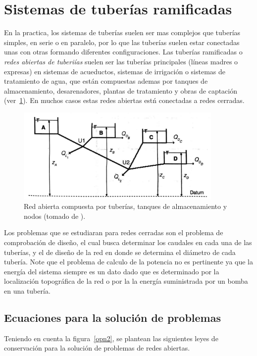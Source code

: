 \documentclass[11pt, oneside]{article}
\begin{document}
\section{Sistemas de tuber\'ias ramificadas} 
En la practica, los sistemas de tuber\'ias suelen ser mas complejos que tuber\'ias simples, en serie o en paralelo, por lo que las tuber\'ias suelen estar conectadas unas con otras formando diferentes configuraciones. Las tuber\'ias ramificadas o \emph{redes abiertas de tuberi\'ias} suelen ser las tuber\'ias principales (l\'ineas madres o expresas) en sistemas de acueductos, sistemas de irrigaci\'on o sistemas de tratamiento de agua, que est\'an compuestas ademas por tanques de almacenamiento, desarenadores, plantas de tratamiento y obras de captaci\'on (ver~\ref{opn1}). En muchos casos estas redes abiertas est\'n conectadas a redes cerradas. 

\begin{figure}[h]
\centering
\includegraphics[width=10cm]{./figs/opn1.jpeg}
\caption{Red abierta compuesta por tuber\'ias, tanques de almacenamiento y nodos (tomado de \cite{saldarriaga}).} 
\label{opn1}
\end{figure}

Los problemas que se estudiaran para redes cerradas son el problema de comprobaci\'on de dise\~no, el cual busca determinar los caudales en cada una de las tuber\'ias, y el de dise\~no de la red en donde se determina el di\'ametro de cada tuber\'ia. Note que el problema de calculo de la potencia no es pertinente ya que la energ\'ia del sistema siempre es un dato dado que es determinado por la localizaci\'on topogr\'afica de la red o por la la energ\'ia suministrada por un bomba en una tuber\'ia. 

\subsection{Ecuaciones para la soluci\'on de problemas}
Teniendo en cuenta la figura~\ref{opn2}, se plantean las siguientes leyes de conservaci\'on para la soluci\'on de problemas de redes abiertas.
\end{document}
